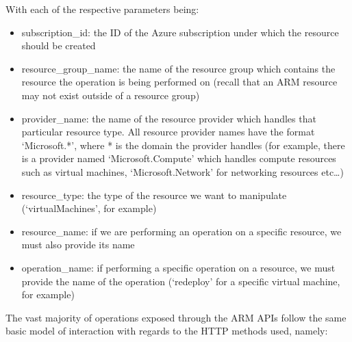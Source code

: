 \documentclass[11pt]{report}
\begin{document}
With each of the respective parameters being:

\begin{itemize}
    \item{subscription\_id}: the ID of the Azure subscription under which the
        resource should be created
    \item{resource\_group\_name}: the name of the resource group which contains
        the resource the operation is being performed on (recall that an
        ARM resource may not exist outside of a resource group)
    \item{provider\_name}: the name of the resource provider which handles that
        particular resource type. All resource provider names have the format
        `Microsoft.*', where * is the domain the provider handles (for
        example, there is a provider named `Microsoft.Compute' which handles
        compute resources such as virtual machines, `Microsoft.Network' for
        networking resources etc\ldots)
    \item{resource\_type}: the type of the resource we want to manipulate
        (`virtualMachines', for example)
    \item{resource\_name}: if we are performing an operation on a specific
        resource, we must also provide its name
    \item{operation\_name}: if performing a specific operation on a resource,
        we must provide the name of the operation (`redeploy' for a specific
        virtual machine, for example)
\end{itemize}

The vast majority of operations exposed through the ARM APIs follow the same
basic model of interaction with regards to the HTTP methods used, namely:
\end{document}
